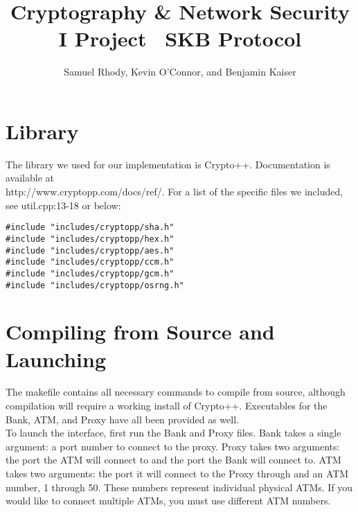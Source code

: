 \documentclass[10pt,a4paper]{article}
\author{Samuel Rhody, Kevin O'Connor, and Benjamin Kaiser}
\title{Cryptography \& Network Security I Project \ SKB Protocol}
\begin{document}

\maketitle{}

\section{Library}

The library we used for our implementation is Crypto++. Documentation is available at\\
http://www.cryptopp.com/docs/ref/. For a list of the specific files we included, see util.cpp:13-18 or below:\\

\begin{lstlisting}
#include "includes/cryptopp/sha.h"
#include "includes/cryptopp/hex.h"
#include "includes/cryptopp/aes.h"
#include "includes/cryptopp/ccm.h"
#include "includes/cryptopp/gcm.h"
#include "includes/cryptopp/osrng.h"
\end{lstlisting}

\section{Compiling from Source and Launching}

The makefile contains all necessary commands to compile from source, although compilation will require a working install of Crypto++. Executables for the Bank, ATM, and Proxy have all been provided as well. \\

To launch the interface, first run the Bank and Proxy files. Bank takes a single argument: a port number to connect to the proxy. Proxy takes two arguments: the port the ATM will connect to and the port the Bank will connect to. ATM takes two arguments: the port it will connect to the Proxy through and an ATM number, 1 through 50. These numbers represent individual physical ATMs. If you would like to connect multiple ATMs, you must use different ATM numbers.\\
\end{document}
